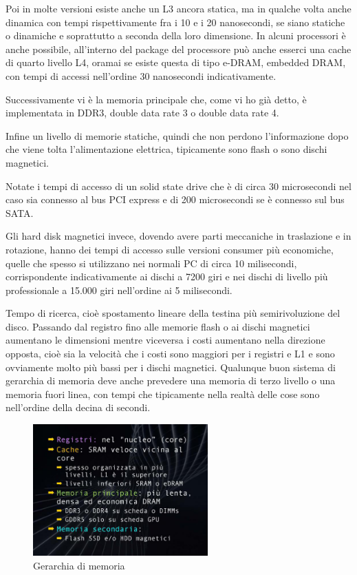 Poi in molte versioni esiste anche un L3 ancora statica, ma in qualche volta anche dinamica con tempi rispettivamente fra i 10 e i 20 nanosecondi, se siano statiche o dinamiche e soprattutto a seconda della loro dimensione.
In alcuni processori è anche possibile, all'interno del package del processore può anche esserci una cache di quarto livello L4, oramai se esiste questa di tipo e-DRAM, embedded DRAM, con tempi di accessi nell'ordine 30 nanosecondi indicativamente.

Successivamente vi è la memoria principale che, come vi ho già detto, è implementata in DDR3, double data rate 3 o double data rate 4.

Infine un livello di memorie statiche, quindi che non perdono l'informazione dopo che viene tolta l'alimentazione elettrica, tipicamente sono flash o sono dischi magnetici.

Notate i tempi di accesso di un solid state drive che è di circa 30 microsecondi nel caso sia connesso al bus PCI express e di 200 microsecondi se è connesso sul bus SATA.

Gli hard disk magnetici invece, dovendo avere parti meccaniche in traslazione e in rotazione, hanno dei tempi di accesso sulle versioni consumer più economiche, quelle che spesso si utilizzano nei normali PC di circa 10 milisecondi, corrispondente indicativamente ai dischi a 7200 giri e nei dischi di livello più professionale a 15.000 giri nell'ordine ai 5 milisecondi.

Tempo di ricerca, cioè spostamento lineare della testina più semirivoluzione del disco.
Passando dal registro fino alle memorie flash o ai dischi magnetici aumentano le dimensioni mentre viceversa i costi aumentano nella direzione opposta, cioè sia la velocità che i costi sono maggiori per i registri e L1 e sono ovviamente molto più bassi per i dischi magnetici.
Qualunque buon sistema di gerarchia di memoria deve anche prevedere una memoria di terzo livello o una memoria fuori linea, con tempi che tipicamente nella realtà delle cose sono nell'ordine della decina di secondi.

\FloatBarrier
\begin{figure}[H]
  \centering
  \includegraphics[width=0.60\textwidth,
                    trim=20 20 10 20, %
                    clip]
                    {images/Lez06_p02_fig_01.png}
  \caption{Gerarchia di memoria}
  \label{fig:Lez06_p02_fig_01}
\end{figure}
\FloatBarrier
\noindent

